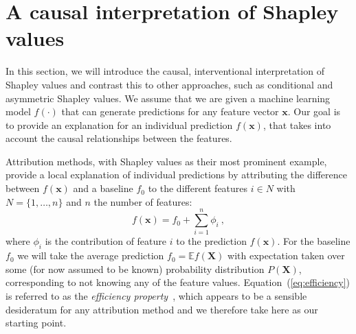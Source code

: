 \documentclass{article}
\newcommand{\vX}{\mathbf{X}}
\newcommand{\vx}{\mathbf{x}}
\newcommand{\expectation}{\mathbb{E}}
\newcommand{\contribution}{{\phi}}
\newcommand{\allfeatures}{{N}}
\begin{document}
\section{A causal interpretation of Shapley values}
\label{sec:interpretation}

In this section, we will introduce the causal, interventional interpretation of Shapley values and contrast this to other approaches, such as conditional and asymmetric Shapley values.
We assume that we are given a machine learning model $f(\cdot)$ that can generate predictions for any feature vector $\vx$. Our goal is to provide an explanation for an individual prediction $f(\vx)$, that takes into account the causal relationships between the features.

Attribution methods, with Shapley values as their most prominent example, provide a local explanation of individual predictions by attributing the difference between $f(\vx)$ and a baseline $f_0$ to the different features $i \in \allfeatures$ with $\allfeatures = \{1,\ldots,n\}$ and $n$ the number of features:
\begin{equation}
f(\vx) = f_0 + \sum_{i=1}^n \contribution_i \: ,
\label{eq:efficiency}
\end{equation}
where $\contribution_i$ is the contribution of feature $i$ to the prediction $f(\vx)$. For the baseline $f_0$ we will take the average prediction $f_0 = \expectation f(\vX)$ with expectation taken over some (for now assumed to be known) probability distribution $P(\vX)$, corresponding to not knowing any of the feature values. Equation~(\ref{eq:efficiency}) is referred to as the {\em efficiency property}~\cite{shapley1953value}, which appears to be a sensible desideratum for any attribution method and we therefore take here as our starting point.
\end{document}
